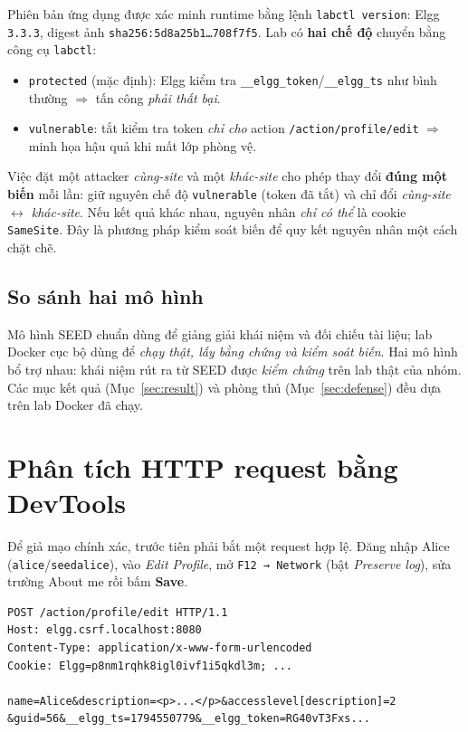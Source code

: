 \documentclass[11pt,a4paper]{article}
\begin{document}
\noindent Phiên bản ứng dụng được xác minh runtime bằng lệnh \texttt{labctl version}: Elgg \texttt{3.3.3}, digest ảnh \texttt{sha256:5d8a25b1\ldots708f7f5}. Lab có \textbf{hai chế độ} chuyển bằng công cụ \texttt{labctl}:
\begin{itemize}
  \item \texttt{protected} (mặc định): Elgg kiểm tra \texttt{\_\_elgg\_token}/\texttt{\_\_elgg\_ts} như bình thường $\Rightarrow$ tấn công \emph{phải thất bại}.
  \item \texttt{vulnerable}: tắt kiểm tra token \emph{chỉ cho} action \texttt{/action/profile/edit} $\Rightarrow$ minh họa hậu quả khi mất lớp phòng vệ.
\end{itemize}

\begin{infobox}
Việc đặt một attacker \emph{cùng-site} và một \emph{khác-site} cho phép thay đổi \textbf{đúng một biến} mỗi lần: giữ nguyên chế độ \texttt{vulnerable} (token đã tắt) và chỉ đổi \emph{cùng-site $\leftrightarrow$ khác-site}. Nếu kết quả khác nhau, nguyên nhân \emph{chỉ có thể} là cookie \texttt{SameSite}. Đây là phương pháp kiểm soát biến để quy kết nguyên nhân một cách chặt chẽ.
\end{infobox}

\subsection{So sánh hai mô hình}
Mô hình SEED chuẩn dùng để giảng giải khái niệm và đối chiếu tài liệu; lab Docker cục bộ dùng để \emph{chạy thật, lấy bằng chứng và kiểm soát biến}. Hai mô hình bổ trợ nhau: khái niệm rút ra từ SEED được \emph{kiểm chứng} trên lab thật của nhóm. Các mục kết quả (Mục~\ref{sec:result}) và phòng thủ (Mục~\ref{sec:defense}) đều dựa trên lab Docker đã chạy.

\section{Phân tích HTTP request bằng DevTools}
Để giả mạo chính xác, trước tiên phải bắt một request hợp lệ. Đăng nhập Alice (\texttt{alice}/\texttt{seedalice}), vào \emph{Edit Profile}, mở \texttt{F12 → Network} (bật \emph{Preserve log}), sửa trường About me rồi bấm \textbf{Save}.

\begin{lstlisting}[style=http,caption={Request POST khi lưu hồ sơ (rút gọn, từ lab thật)}]
POST /action/profile/edit HTTP/1.1
Host: elgg.csrf.localhost:8080
Content-Type: application/x-www-form-urlencoded
Cookie: Elgg=p8nm1rqhk8igl0ivf1i5qkdl3m; ...

name=Alice&description=<p>...</p>&accesslevel[description]=2
&guid=56&__elgg_ts=1794550779&__elgg_token=RG40vT3Fxs...
\end{lstlisting}
\end{document}
